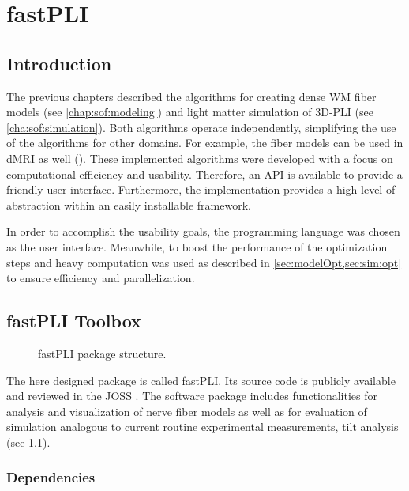\cleardoublepage
\setcounter{chapter}{6}
\chapter{\acs{fastPLI}}
\label{chap:Software}
%
%
%
\section{Introduction}\label{sec:fastpliIntro}
%
The previous chapters described the algorithms for creating dense \ac{WM} fiber models (see \cref{chap:sof:modeling}) and light matter simulation of \ac{3D-PLI} (see \cref{cha:sof:simulation}).
Both algorithms operate independently, simplifying the use of the algorithms for other domains.
For example, the fiber models can be used in \ac{dMRI} as well (\cite{Ginsburger2019,ginsburgerDis2019}).
These implemented algorithms were developed with a focus on computational efficiency and usability.
Therefore, an \ac{API} is available to provide a friendly user interface.
Furthermore, the implementation provides a high level of abstraction within an easily installable framework.
\par
%
In order to accomplish the usability goals, the \python{} programming language was chosen as the user interface.
Meanwhile, to boost the performance of the optimization steps and heavy computation \cpp{} was used as described in \cref{sec:modelOpt,sec:sim:opt} to ensure efficiency and parallelization.
%
%
%
\section{fastPLI Toolbox}
%
\begin{figure}[!ht]
\centering
{}
\caption[]{\acs{fastPLI} package structure.}
\label{fig:fastpli}
\end{figure}
%
The here designed \python{} package is called  \ac{fastPLI}.
Its source code is publicly available and reviewed in the  \ac{JOSS} \cite{fastpli,Matuschke2021}.
The software package includes functionalities for analysis and visualization of nerve fiber models as well as for evaluation of simulation analogous to current routine experimental measurements, \eg{} tilt analysis (see \cref{fig:fastpli}).
%
%
%
\newpage
\subsection{Dependencies}
%
